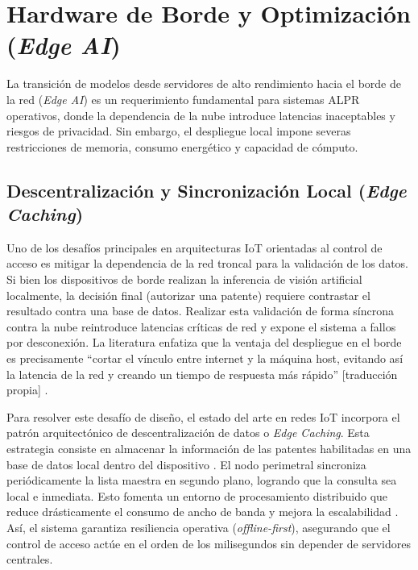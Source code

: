 \section{Hardware de Borde y Optimización (\textit{Edge AI})}

La transición de modelos desde servidores de alto rendimiento hacia el borde de la 
red (\textit{Edge AI}) es un requerimiento fundamental para sistemas ALPR operativos, 
donde la dependencia de la nube introduce latencias inaceptables y riesgos de privacidad. 
Sin embargo, el despliegue local impone severas restricciones de memoria, consumo 
energético y capacidad de cómputo.

\subsection{Descentralización y Sincronización Local (\textit{Edge Caching})}

Uno de los desafíos principales en arquitecturas IoT orientadas al control de acceso es mitigar la dependencia de la red troncal para la validación de los datos. Si bien los dispositivos de borde realizan la inferencia de visión artificial localmente, la decisión final (autorizar una patente) requiere contrastar el resultado contra una base de datos. Realizar esta validación de forma síncrona contra la nube reintroduce latencias críticas de red y expone el sistema a fallos por desconexión. La literatura enfatiza que la ventaja del despliegue en el borde es precisamente ``cortar el vínculo entre internet y la máquina host, evitando así la latencia de la red y creando un tiempo de respuesta más rápido'' [traducción propia] \parencite{swatiEfficientDeepLearning2024}.

Para resolver este desafío de diseño, el estado del arte en redes IoT incorpora el patrón arquitectónico de descentralización de datos o \textit{Edge Caching}. Esta estrategia consiste en almacenar la información de las patentes habilitadas en una base de datos local dentro del dispositivo \parencite{xuDeepLearningAlgorithms2026c}. El nodo perimetral sincroniza periódicamente la lista maestra en segundo plano, logrando que la consulta sea local e inmediata. Esto fomenta un entorno de procesamiento distribuido que reduce drásticamente el consumo de ancho de banda y mejora la escalabilidad \parencite{buleuDeepLearningBasedSystem2025a, kuyunsaDeepLearningEnhancedAutomatic2025}. Así, el sistema garantiza resiliencia operativa (\textit{offline-first}), asegurando que el control de acceso actúe en el orden de los milisegundos sin depender de servidores centrales.

